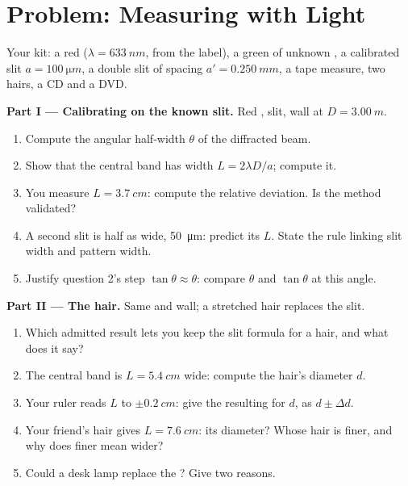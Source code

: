 \section{Problem: Measuring with Light}

\begin{problem}
\label{pb:g12:light-as-wave:1}
Your kit: a red  ($\lambda = \qty{633}{nm}$, from the label), a
green  of unknown , a calibrated slit
$a = \qty{100}{\micro m}$, a double slit of spacing $a' =
\qty{0.250}{mm}$, a tape measure, two hairs, a CD and a DVD.

\medskip
\noindent\textbf{Part I --- Calibrating on the known slit.}
Red , slit, wall at $D = \qty{3.00}{m}$.
\begin{enumerate}
  \item Compute the angular half-width $\theta$ of the diffracted beam.
  \item Show that the central band has width $L = 2\lambda D/a$;
        compute it.
  \item You measure $L = \qty{3.7}{cm}$: compute the relative
        deviation. Is the method validated?
  \item A second slit is half as wide, \qty{50}{\micro m}: predict its
        $L$. State the rule linking slit width and pattern width.
  \item Justify question 2's step $\tan\theta \approx \theta$: compare
        $\theta$ and $\tan\theta$ at this angle.
\end{enumerate}

\medskip
\noindent\textbf{Part II --- The hair.} Same  and wall; a
stretched hair replaces the slit.
\begin{enumerate}[resume]
  \item Which admitted result lets you keep the slit formula for a
        hair, and what does it say?
  \item The central band is $L = \qty{5.4}{cm}$ wide: compute the
        hair's diameter $d$.
  \item Your ruler reads $L$ to $\pm\qty{0.2}{cm}$: give the resulting
         for $d$, as $d \pm \Delta d$.
  \item Your friend's hair gives $L = \qty{7.6}{cm}$: its diameter?
        Whose hair is finer, and why does finer mean wider?
  \item Could a desk lamp replace the ? Give two reasons.
\end{enumerate}


\end{problem}
